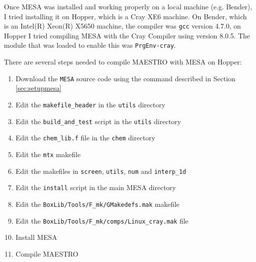 
Once {\sf MESA} was installed and working properly on a local machine (e.g. 
Bender), I tried installing it on Hopper, which is a Cray XE6 machine. On 
Bender, which is an Intel(R) Xeon(R) X5650 machine, the compiler was 
{\tt gcc} version 4.7.0, on Hopper I tried compiling {\sf MESA} with the 
Cray Compiler using version 8.0.5. The module that was loaded to enable this 
was {\tt PrgEnv-cray}.

There are several steps needed to compile {\sf MAESTRO} with {\sf MESA} on 
Hopper:
\begin{enumerate}
\item Download the {\tt MESA} source code using the command described in 
Section \ref{sec:setupmesa}
\item Edit the {\tt makefile\_header} in the {\tt utils} directory
\item Edit the {\tt build\_and\_test} script in the {\tt utils} directory
\item Edit the {\tt chem\_lib.f} file in the {\tt chem} directory
\item Edit the {\tt mtx} makefile
\item Edit the makefiles in {\tt screen}, {\tt utils}, {\tt num} and 
{\tt interp\_1d}
\item Edit the {\tt install} script in the main {\sf MESA} directory
\item Edit the {\tt BoxLib/Tools/F\_mk/GMakedefs.mak} makefile
\item Edit the {\tt BoxLib/Tools/F\_mk/comps/Linux\_cray.mak} file
\item Install {\sf MESA}
\item Compile {\sf MAESTRO}
\end{enumerate}

